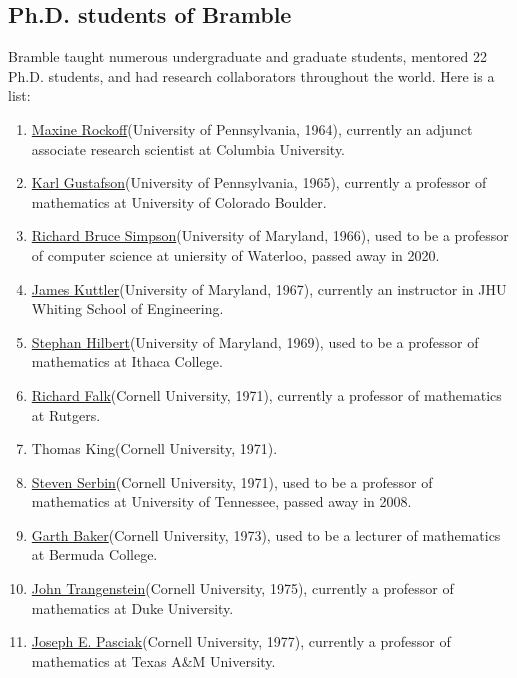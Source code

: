 \documentclass[CJK,11pt]{amsart}
\theoremstyle{definition}
\begin{document}
\begin{CJK*}{UTF8}{gbsn}
\subsection{Ph.D. students of Bramble}
Bramble taught numerous undergraduate and graduate students, mentored
22 Ph.D. students, and had {\color{red} research collaborators}
throughout the world. Here is a list:
% 
\begin{enumerate}
\item \href{https://www.linkedin.com/in/maxine-rockoff-394b114/}{Maxine Rockoff}(University of Pennsylvania, 1964), currently an adjunct associate research scientist at Columbia University.
\item \href{http://euclid.colorado.edu/~gustafs/}{Karl Gustafson}(University of Pennsylvania, 1965), currently a professor of mathematics at University of Colorado Boulder.
\item \href{https://cs.uwaterloo.ca/~rbsimpso/RBScv.pdf}{Richard Bruce Simpson}(University of Maryland, 1966), used to be a professor of computer science at uniersity of Waterloo, passed away in 2020.
\item \href{https://ep.jhu.edu/faculty/james-kuttler/}{James Kuttler}(University of Maryland, 1967), currently an instructor in JHU Whiting School of Engineering.
\item \href{https://en.wikipedia.org/wiki/Stephen_Hilbert}{Stephan Hilbert}(University of Maryland, 1969), used to be a professor of mathematics at Ithaca College.
\item \href{https://sites.math.rutgers.edu/~falk/}{Richard Falk}(Cornell University, 1971), currently a professor of mathematics at Rutgers.
\item Thomas King(Cornell University, 1971).
\item \href{https://www.legacy.com/us/obituaries/knoxnews/name/steven-serbin-obituary?pid=120620923}{Steven Serbin}(Cornell University, 1971), used to be a professor of mathematics at University of Tennessee, passed away in 2008.
\item \href{http://www.math.buffalo.edu/mad/PEEPS/baker_gartha.html}{Garth Baker}(Cornell University, 1973), used to be a lecturer of mathematics at Bermuda College.
\item \href{https://services.math.duke.edu/~johnt/}{John Trangenstein}(Cornell University, 1975), currently a professor of mathematics at Duke University.
\item \href{https://www.math.tamu.edu/~joe.pasciak/}{Joseph E. Pasciak}(Cornell University, 1977), currently a professor of mathematics at Texas A\&M University.

\end{enumerate}
\end{CJK*}
\end{document}
